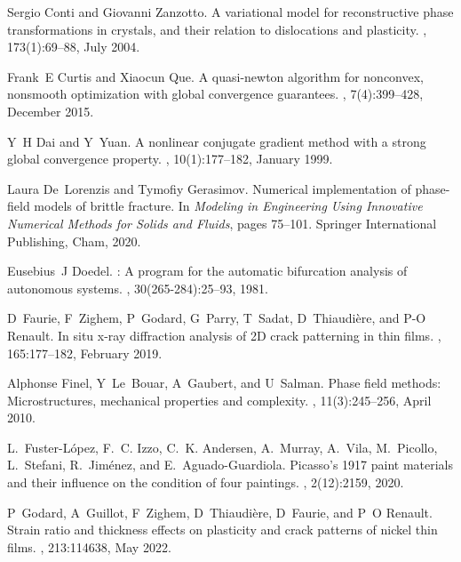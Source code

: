 \documentclass[10pt]{article}
\begin{document}
\begin{thebibliography}{10}
Sergio Conti and Giovanni Zanzotto.
\newblock A variational model for reconstructive phase transformations in crystals, and their relation to dislocations and plasticity.
, 173(1):69--88, July 2004.

Frank~E Curtis and Xiaocun Que.
\newblock A quasi-newton algorithm for nonconvex, nonsmooth optimization with global convergence guarantees.
, 7(4):399--428, December 2015.

Y~H Dai and Y~Yuan.
\newblock A nonlinear conjugate gradient method with a strong global convergence property.
, 10(1):177--182, January 1999.

Laura De~Lorenzis and Tymofiy Gerasimov.
\newblock Numerical implementation of phase-field models of brittle fracture.
\newblock In {\em Modeling in Engineering Using Innovative Numerical Methods for Solids and Fluids}, pages 75--101. Springer International Publishing, Cham, 2020.

Eusebius~J Doedel.
: A program for the automatic bifurcation analysis of autonomous systems.
, 30(265-284):25--93, 1981.

D~Faurie, F~Zighem, P~Godard, G~Parry, T~Sadat, D~Thiaudi{\`e}re, and P-O Renault.
\newblock In situ x-ray diffraction analysis of {2D} crack patterning in thin films.
, 165:177--182, February 2019.

Alphonse Finel, Y~Le~Bouar, A~Gaubert, and U~Salman.
\newblock Phase field methods: Microstructures, mechanical properties and complexity.
, 11(3):245--256, April 2010.

L.~Fuster-L{\'o}pez, F.~C. Izzo, C.~K. Andersen, A.~Murray, A.~Vila, M.~Picollo, L.~Stefani, R.~Jim{\'e}nez, and E.~Aguado-Guardiola.
\newblock Picasso's 1917 paint materials and their influence on the condition of four paintings.
, 2(12):2159, 2020.

P~Godard, A~Guillot, F~Zighem, D~Thiaudi{\`e}re, D~Faurie, and P~O Renault.
\newblock Strain ratio and thickness effects on plasticity and crack patterns of nickel thin films.
, 213:114638, May 2022.


\end{thebibliography}
\end{document}
